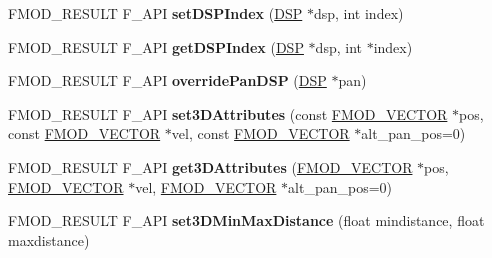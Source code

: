 \begin{DoxyCompactItemize}
\item 
\hypertarget{class_f_m_o_d_1_1_channel_control_a0e667d534c4af622d2afdf5237541c72}{F\+M\+O\+D\+\_\+\+R\+E\+S\+U\+L\+T F\+\_\+\+A\+P\+I {\bfseries set\+D\+S\+P\+Index} (\hyperlink{class_f_m_o_d_1_1_d_s_p}{D\+S\+P} $\ast$dsp, int index)}\label{class_f_m_o_d_1_1_channel_control_a0e667d534c4af622d2afdf5237541c72}

\item 
\hypertarget{class_f_m_o_d_1_1_channel_control_a12ec28e3f98f5c58abc2c5a926572ea2}{F\+M\+O\+D\+\_\+\+R\+E\+S\+U\+L\+T F\+\_\+\+A\+P\+I {\bfseries get\+D\+S\+P\+Index} (\hyperlink{class_f_m_o_d_1_1_d_s_p}{D\+S\+P} $\ast$dsp, int $\ast$index)}\label{class_f_m_o_d_1_1_channel_control_a12ec28e3f98f5c58abc2c5a926572ea2}

\item 
\hypertarget{class_f_m_o_d_1_1_channel_control_a45b36878b9ad42fadeb26d606ea79797}{F\+M\+O\+D\+\_\+\+R\+E\+S\+U\+L\+T F\+\_\+\+A\+P\+I {\bfseries override\+Pan\+D\+S\+P} (\hyperlink{class_f_m_o_d_1_1_d_s_p}{D\+S\+P} $\ast$pan)}\label{class_f_m_o_d_1_1_channel_control_a45b36878b9ad42fadeb26d606ea79797}

\item 
\hypertarget{class_f_m_o_d_1_1_channel_control_a8de9f9459a04a145ddd12aac3889058f}{F\+M\+O\+D\+\_\+\+R\+E\+S\+U\+L\+T F\+\_\+\+A\+P\+I {\bfseries set3\+D\+Attributes} (const \hyperlink{struct_f_m_o_d___v_e_c_t_o_r}{F\+M\+O\+D\+\_\+\+V\+E\+C\+T\+O\+R} $\ast$pos, const \hyperlink{struct_f_m_o_d___v_e_c_t_o_r}{F\+M\+O\+D\+\_\+\+V\+E\+C\+T\+O\+R} $\ast$vel, const \hyperlink{struct_f_m_o_d___v_e_c_t_o_r}{F\+M\+O\+D\+\_\+\+V\+E\+C\+T\+O\+R} $\ast$alt\+\_\+pan\+\_\+pos=0)}\label{class_f_m_o_d_1_1_channel_control_a8de9f9459a04a145ddd12aac3889058f}

\item 
\hypertarget{class_f_m_o_d_1_1_channel_control_ae889a0ccee9653108836bfaf8b5fcbbd}{F\+M\+O\+D\+\_\+\+R\+E\+S\+U\+L\+T F\+\_\+\+A\+P\+I {\bfseries get3\+D\+Attributes} (\hyperlink{struct_f_m_o_d___v_e_c_t_o_r}{F\+M\+O\+D\+\_\+\+V\+E\+C\+T\+O\+R} $\ast$pos, \hyperlink{struct_f_m_o_d___v_e_c_t_o_r}{F\+M\+O\+D\+\_\+\+V\+E\+C\+T\+O\+R} $\ast$vel, \hyperlink{struct_f_m_o_d___v_e_c_t_o_r}{F\+M\+O\+D\+\_\+\+V\+E\+C\+T\+O\+R} $\ast$alt\+\_\+pan\+\_\+pos=0)}\label{class_f_m_o_d_1_1_channel_control_ae889a0ccee9653108836bfaf8b5fcbbd}

\item 
\hypertarget{class_f_m_o_d_1_1_channel_control_abdf3cebe9997771b6844819ee7eb85e9}{F\+M\+O\+D\+\_\+\+R\+E\+S\+U\+L\+T F\+\_\+\+A\+P\+I {\bfseries set3\+D\+Min\+Max\+Distance} (float mindistance, float maxdistance)}\label{class_f_m_o_d_1_1_channel_control_abdf3cebe9997771b6844819ee7eb85e9}


\end{DoxyCompactItemize}
